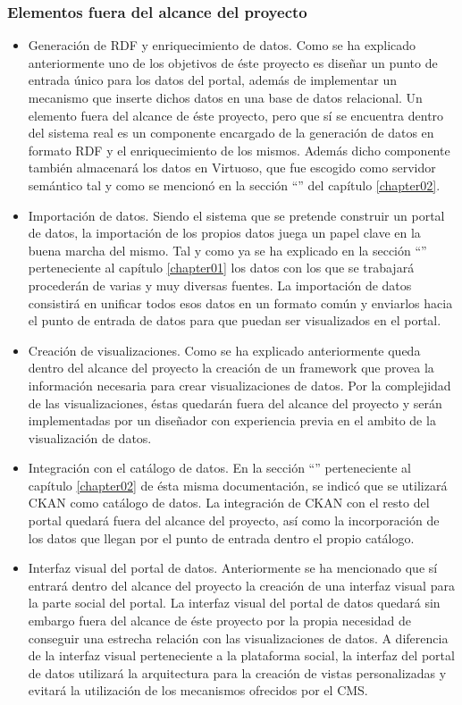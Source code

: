 \subsubsection{Elementos fuera del alcance del proyecto}
\begin{itemize}
\item Generación de RDF y enriquecimiento de datos.  Como se ha explicado anteriormente uno de los objetivos de éste proyecto es diseñar un punto de entrada único para los datos del portal, además de implementar un mecanismo que inserte dichos datos en una base de datos relacional.  Un elemento fuera del alcance de éste proyecto, pero que sí se encuentra dentro del sistema real es un componente encargado de la generación de datos en formato RDF y el enriquecimiento de los mismos.  Además dicho componente también almacenará los datos en Virtuoso, que fue escogido como servidor semántico tal y como se mencionó en la sección ``'' del capítulo \ref{chapter02}.
\item Importación de datos.  Siendo el sistema que se pretende construir un portal de datos, la importación de los propios datos juega un papel clave en la buena marcha del mismo.  Tal y como ya se ha explicado en la sección ``'' perteneciente al capítulo \ref{chapter01} los datos con los que se trabajará procederán de varias y muy diversas fuentes.  La importación de datos consistirá en unificar todos esos datos en un formato común y enviarlos hacia el punto de entrada de datos para que puedan ser visualizados en el portal.
\item Creación de visualizaciones.  Como se ha explicado anteriormente queda dentro del alcance del proyecto la creación de un framework que provea la información necesaria para crear visualizaciones de datos.  Por la complejidad de las visualizaciones, éstas quedarán fuera del alcance del proyecto y serán implementadas por un diseñador con experiencia previa en el ambito de la visualización de datos.
\item Integración con el catálogo de datos.  En la sección ``'' perteneciente al capítulo \ref{chapter02} de ésta misma documentación, se indicó que se utilizará CKAN como catálogo de datos.  La integración de CKAN con el resto del portal quedará fuera del alcance del proyecto, así como la incorporación de los datos que llegan por el punto de entrada dentro el propio catálogo. 
\item Interfaz visual del portal de datos.  Anteriormente se ha mencionado que sí entrará dentro del alcance del proyecto la creación de una interfaz visual para la parte social del portal.  La interfaz visual del portal de datos quedará sin embargo fuera del alcance de éste proyecto por la propia necesidad de conseguir una estrecha relación con las visualizaciones de datos.  A diferencia de la interfaz visual perteneciente a la plataforma social, la interfaz del portal de datos utilizará la arquitectura para la creación de vistas personalizadas y evitará la utilización de los mecanismos ofrecidos por el CMS.
\end{itemize}